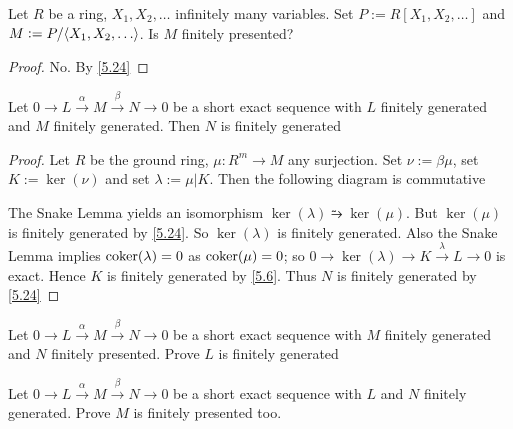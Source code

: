 \documentclass[11pt]{article}
\begin{document}
\begin{exercise}
\label{5.25}
Let \(R\) be a ring, \(X_1,X_2,\dots\) infinitely many variables. Set
\(P:=R[X_1,X_2,\dots]\) and \(M:=P/\la X_1,X_2,\dots\ra\). Is \(M\) finitely presented?
\end{exercise}

\begin{proof}
No. By \ref{5.24}
\end{proof}

\begin{proposition}[]
Let \(0\to L\xrightarrow{\alpha}M\xrightarrow{\beta}N\to0\) be a short exact sequence
with \(L\) finitely generated and \(M\) finitely generated. Then \(N\) is
finitely generated
\end{proposition}

\begin{proof}
Let \(R\) be the ground ring, \(\mu:R^m\to M\) any surjection. Set
\(\nu:=\beta\mu\), set \(K:=\ker(\nu)\) and set \(\lambda:=\mu|K\). Then the following
diagram is commutative
\begin{center}
\end{center}
The Snake Lemma yields an isomorphism \(\ker(\lambda)\similarrightarrow\ker(\mu)\).
But \(\ker(\mu)\) is finitely generated by \ref{5.24}. So \(\ker(\lambda)\) is finitely
generated. Also the Snake Lemma implies \(\operatorname{coker}(\lambda)=0\) as \(\operatorname{coker}(\mu)=0\);
so \(0\to\ker(\lambda)\to K\xrightarrow{\lambda}L\to0\) is exact. Hence \(K\) is finitely
generated by \ref{5.6}. Thus \(N\) is finitely generated by \ref{5.24}
\end{proof}

\begin{exercise}
\label{5.27}
Let \(0\to L\xrightarrow{\alpha}M\xrightarrow{\beta}N\to0\) be a short exact sequence
with \(M\) finitely generated and \(N\) finitely presented. Prove \(L\) is
finitely generated
\end{exercise}

\begin{proposition}[]
\label{5.28}
Let \(0\to L\xrightarrow{\alpha}M\xrightarrow{\beta}N\to0\) be a short exact sequence
with \(L\) and \(N\) finitely generated. Prove \(M\) is finitely presented too.
\end{proposition}
\end{document}
